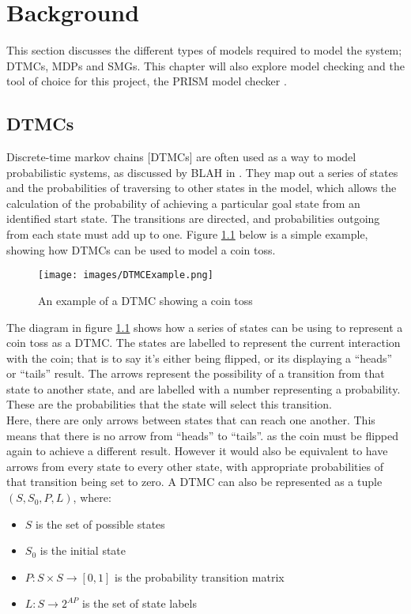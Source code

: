 \documentclass{l4proj}
\begin{document}
\chapter{Background}
This section discusses the different types of models required to model the system; DTMCs, MDPs and SMGs. This chapter will also explore model checking and the tool of choice for this project, the PRISM model checker \cite{Pri}.

\section{DTMCs}
Discrete-time markov chains [DTMCs] are often used as a way to model probabilistic systems, as discussed by BLAH in \cite{}. They map out a series of states and the probabilities of traversing to other states in the model, which allows the calculation of the probability of achieving a particular goal state from an identified start state. The transitions are directed, and probabilities outgoing from each state must add up to one. Figure \ref{dtmc} below is a simple example, showing how DTMCs can be used to model a coin toss.

\begin{figure}[h!]
\centering
\texttt{[image: images/DTMCExample.png]}
\caption{An example of a DTMC showing a coin toss}
\label{dtmc}
\end{figure}

The diagram in figure \ref{dtmc} shows how a series of states can be using to represent a coin toss as a DTMC. The states are labelled to represent the current interaction with the coin; that is to say it's either being flipped, or its displaying a ``heads'' or ``tails'' result. The arrows represent the possibility of a transition from that state to another state, and are labelled with a number representing a probability. These are the probabilities that the state will select this transition.\\
Here, there are only arrows between states that can reach one another. This means that there is no arrow from ``heads'' to ``tails''. as the coin must be flipped again to achieve a different result. However it would also be equivalent to have arrows from every state to every other state, with appropriate probabilities of that transition being set to zero.
A DTMC can also be represented as a tuple $(S, S{_0}, P, L)$, where:
\begin{itemize}
\item{$S$ is the set of possible states}
\item{$S{_0}$ is the initial state}
\item{$P : S \times S \rightarrow [0,1]$ is the probability transition matrix}
\item{$L : S \rightarrow 2^{AP}$ is the set of state labels}
\end{itemize}
\end{document}
